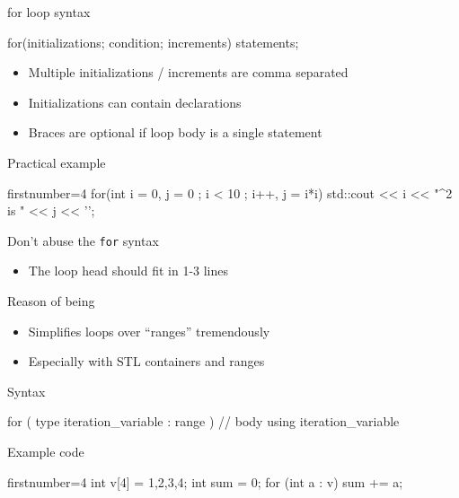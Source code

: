 \begin{frame}[fragile]
  \begin{block}{for loop syntax}
    \begin{cppcode*}{}
      for(initializations; condition; increments) {
        statements;
      }
    \end{cppcode*}
    \vspace{-0.2cm}
    \begin{itemize}
      \item Multiple initializations / increments are comma separated
      \item Initializations can contain declarations
      \item Braces are optional if loop body is a single statement
    \end{itemize}
  \end{block}
  \pause
  \begin{exampleblock}{Practical example}
    \begin{cppcode*}{firstnumber=4}
      for(int i = 0, j = 0 ; i < 10 ; i++, j = i*i) {
        std::cout << i << "^2 is " << j << '\n';
      }
    \end{cppcode*}
  \end{exampleblock}
  \pause
  \begin{goodpractice}{Don't abuse the \texttt{for} syntax}
    \begin{itemize}
      \item The  loop head should fit in 1-3 lines
    \end{itemize}
  \end{goodpractice}
\end{frame}

\begin{frame}[fragile]
  \begin{block}{Reason of being}
    \begin{itemize}
    \item Simplifies loops over ``ranges'' tremendously
    \item Especially with STL containers and ranges
    \end{itemize}
  \end{block}
  \begin{block}{Syntax}
    \begin{cppcode*}{}
      for ( type iteration_variable : range ) {
        // body using iteration_variable
      }
    \end{cppcode*}
  \end{block}
  \begin{exampleblock}{Example code}
    \begin{cppcode*}{firstnumber=4}
      int v[4] = {1,2,3,4};
      int sum = 0;
      for (int a : v) { sum += a; }
    \end{cppcode*}
  \end{exampleblock}
\end{frame}

